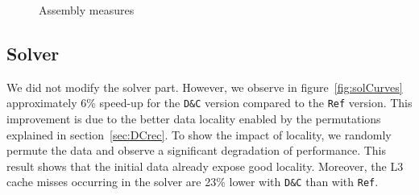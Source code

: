 \documentclass[10pt]{IOS-Book-Article}
\begin{document}
\begin{figure}[htp]
 \centering
 \caption{Assembly measures}
 \label{fig:asmCurves}
\end{figure}

\subsection{Solver}
We did not modify the solver part. However, we observe in figure~\ref{fig:solCurves} approximately 6\% speed-up for the {\tt D\&C} version compared to the {\tt Ref} version.
This improvement is due to the better data locality enabled by the permutations explained in section~\ref{sec:DCrec}.
To show the impact of locality, we randomly permute the data and observe a significant degradation of performance.
This result shows that the initial data already expose good locality.
Moreover, the L3 cache misses occurring in the solver are 23\% lower with {\tt D\&C} than with {\tt Ref}.
\end{document}
